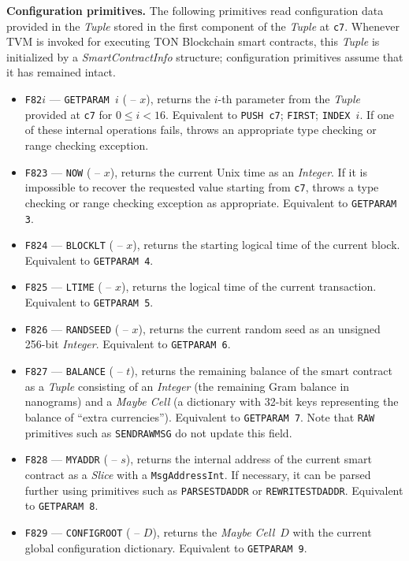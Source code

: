 \documentclass[12pt,oneside]{article}
\def\makepoint#1{\medbreak\noindent{\bf #1.\ }}
\def\nxsubpoint{\refstepcounter{subsubsection}%
  \smallbreak\makepoint{\thesubsubsection}}
\def\emb#1{\textbf{#1.}}
\begin{document}
\nxsubpoint\emb{Configuration primitives}\label{sp:prim.conf.param}
The following primitives read configuration data provided in the {\em Tuple\/} stored in the first component of the {\em Tuple\/} at {\tt c7}. Whenever TVM is invoked for executing TON Blockchain smart contracts, this {\em Tuple\/} is initialized by a {\em SmartContractInfo\/} structure; configuration primitives assume that it has remained intact.
\begin{itemize}
\item {\tt F82$i$} --- {\tt GETPARAM $i$} ( -- $x$), returns the $i$-th parameter from the {\em Tuple\/} provided at {\tt c7} for $0\leq i<16$. Equivalent to {\tt PUSH c7}; {\tt FIRST}; {\tt INDEX $i$}. If one of these internal operations fails, throws an appropriate type checking or range checking exception.
\item {\tt F823} --- {\tt NOW} ( -- $x$), returns the current Unix time as an {\em Integer}. If it is impossible to recover the requested value starting from {\tt c7}, throws a type checking or range checking exception as appropriate. Equivalent to {\tt GETPARAM 3}.
\item {\tt F824} --- {\tt BLOCKLT} ( -- $x$), returns the starting logical time of the current block. Equivalent to {\tt GETPARAM 4}.
\item {\tt F825} --- {\tt LTIME} ( -- $x$), returns the logical time of the current transaction. Equivalent to {\tt GETPARAM 5}.
\item {\tt F826} --- {\tt RANDSEED} ( -- $x$), returns the current random seed as an unsigned 256-bit {\em Integer}. Equivalent to {\tt GETPARAM 6}.
\item {\tt F827} --- {\tt BALANCE} ( -- $t$), returns the remaining balance of the smart contract as a {\em Tuple\/} consisting of an {\em Integer} (the remaining Gram balance in nanograms) and a {\em Maybe Cell} (a dictionary with 32-bit keys representing the balance of ``extra currencies''). Equivalent to {\tt GETPARAM 7}. Note that {\tt RAW} primitives such as {\tt SENDRAWMSG} do not update this field. 
\item {\tt F828} --- {\tt MYADDR} ( -- $s$), returns the internal address of the current smart contract as a {\em Slice\/} with a {\tt MsgAddressInt}. If necessary, it can be parsed further using primitives such as {\tt PARSESTDADDR} or {\tt REWRITESTDADDR}. Equivalent to {\tt GETPARAM 8}.
\item {\tt F829} --- {\tt CONFIGROOT} ( -- $D$), returns the {\em Maybe Cell\/}~$D$ with the current global configuration dictionary. Equivalent to {\tt GETPARAM 9}.

\end{itemize}
\end{document}
